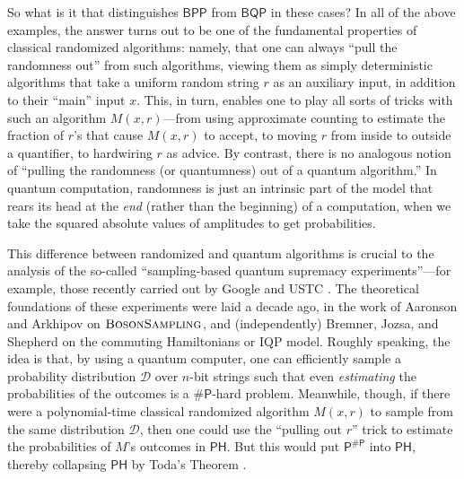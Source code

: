 \documentclass[11pt]{article}%
\begin{document}
So what is it that distinguishes $\mathsf{BPP}$ from $\mathsf{BQP}$ in these cases?  In all of the above examples, the answer turns out to be one of the fundamental properties of classical randomized algorithms: namely, that one can always ``pull the randomness out'' from such algorithms, viewing them as simply deterministic algorithms that take a uniform random string $r$ as an auxiliary input, in addition to their ``main'' input $x$.  This, in turn, enables one to play all sorts of tricks with such an algorithm $M(x,r)$---from using approximate counting to estimate the fraction of $r$'s that cause $M(x,r)$ to accept, to moving $r$ from inside to outside a quantifier, to hardwiring $r$ as advice.  By contrast, there is no analogous notion of ``pulling the randomness (or quantumness) out of a quantum algorithm.''  In quantum computation, randomness is just an intrinsic part of the model that rears its head at the \textit{end} (rather than the beginning) of a computation, when we take the squared absolute values of amplitudes to get probabilities.

This difference between randomized and quantum algorithms is crucial to the analysis of the so-called ``sampling-based quantum supremacy experiments''---for example, those recently carried out by Google \cite{AAB+19} and USTC \cite{ZWD+20}.  The theoretical foundations of these experiments were laid a decade ago, in the work of Aaronson and Arkhipov \cite{AA13} on $\textsc{BosonSampling}$, and (independently) Bremner, Jozsa, and Shepherd \cite{BJS10} on the commuting Hamiltonians or IQP model. Roughly speaking, the idea is that, by using a quantum computer, one can efficiently sample a probability distribution $\mathcal{D}$ over $n$-bit strings such that even \textit{estimating} the probabilities of the outcomes is a $\mathsf{\# P}$-hard problem.  Meanwhile, though, if there were a polynomial-time classical randomized algorithm $M(x,r)$ to sample from the same distribution $\mathcal{D}$, then one could use the ``pulling out $r$'' trick to estimate the probabilities of $M$'s outcomes in $\mathsf{PH}$.  But this would put $\mathsf{P}^\mathsf{\# P}$ into $\mathsf{PH}$, thereby collapsing $\mathsf{PH}$ by Toda's Theorem \cite{Tod91}.
\end{document}
